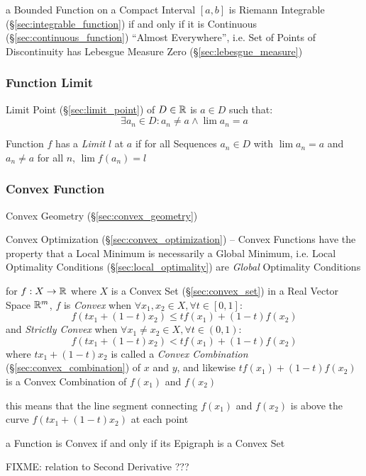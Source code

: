 a Bounded Function on a Compact Interval $[a,b]$ is Riemann Integrable
(\S\ref{sec:integrable_function}) if and only if it is Continuous
(\S\ref{sec:continuous_function}) ``Almost Everywhere'', i.e. Set of Points of
Discontinuity has Lebesgue Measure Zero (\S\ref{sec:lebesgue_measure})



\subsubsection{Function Limit}\label{sec:function_limit}

Limit Point (\S\ref{sec:limit_point}) of $D \in \mathbb{R}$ is $a \in D$
such that:
\[
  \exists a_n \in D : a_n \neq a \wedge \lim a_n = a
\]

Function $f$ has a \emph{Limit} $l$ at $a$ if for all Sequences $a_n
\in D$ with $\lim a_n = a$ and $a_n \neq a$ for all $n$, $\lim f(a_n)
= l$



\subsubsection{Convex Function}\label{sec:convex_function}

\fist Convex Geometry (\S\ref{sec:convex_geometry})

\fist Convex Optimization (\S\ref{sec:convex_optimization}) -- Convex Functions
have the property that a Local Minimum is necessarily a Global Minimum, i.e.
Local Optimality Conditions (\S\ref{sec:local_optimality}) are \emph{Global}
Optimality Conditions

for $f : X \rightarrow \mathbb{R}$ where $X$ is a Convex Set
(\S\ref{sec:convex_set}) in a Real Vector Space $\mathbb{R}^m$, $f$ is
\emph{Convex} when $\forall x_1, x_2 \in X, \forall t \in [0,1]$:
\[
  f(tx_1 + (1-t)x_2) \leq tf(x_1) + (1-t)f(x_2)
\]
and \emph{Strictly Convex} when $\forall x_1 \neq x_2 \in X, \forall t \in
(0,1)$:
\[
  f(tx_1 + (1-t)x_2) < tf(x_1) + (1-t)f(x_2)
\]
where $tx_1 + (1-t)x_2$ is called a \emph{Convex Combination}
(\S\ref{sec:convex_combination}) of $x$ and $y$, and likewise $tf(x_1) +
(1-t)f(x_2)$ is a Convex Combination of $f(x_1)$ and $f(x_2)$

this means that the line segment connecting $f(x_1)$ and $f(x_2)$ is above the
curve $f(tx_1 + (1-t)x_2)$ at each point

a Function is Convex if and only if its Epigraph is a Convex Set

FIXME: relation to Second Derivative ???

